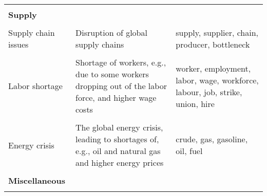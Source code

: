 \begin{table}
\begin{scriptsize}
\begin{tabular}[htp]{p{3.5cm}|p{5cm}|p{5cm}}
			&                                                                                                                                                                                                 &                                                                                                                                             \\
			\textbf{Supply}          &                                                                                                                                                                                                 &                                                                                                                                             \\ \midrule \\[0.02cm]
			Supply chain issues      & Disruption of global supply chains                                                                                                                                                             & supply, supplier, chain, producer, bottleneck                                                      \\ \\[0.02cm]
			Labor shortage           & Shortage of workers, e.g., due   to some workers dropping out of the labor force, and higher wage costs  & worker, employment, labor, wage, workforce, labour, job, strike, union, hire            \\ \\[0.02cm]
			Energy crisis            &  The global energy crisis,   leading to shortages of, e.g., oil and natural gas and higher energy prices 
			& crude, gas, gasoline, oil, fuel                                                                                                             \\ 
			&                                                                                                                                                                                                 &                                                                                                                                             \\
			\textbf{Miscellaneous}   &                                                                                                                                                                                                 &                                                                                                                                             \\ \hline \\[0.02cm]

\end{tabular}
\end{scriptsize}
\end{table}
